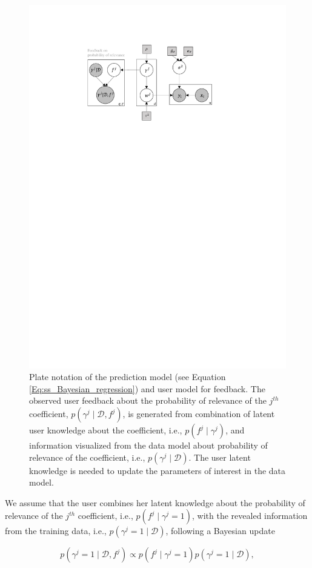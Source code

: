 \documentclass[dissertation,math,vertlayout,pdfa,colorlinks]{aaltoseries}
\newcommand{\bD}{\mathcal{D}}
\begin{document}
\begin{figure}
	\centering
	\includegraphics[width=0.80\linewidth]{Figures/Plate_diagram_OF.pdf}
	\caption{Plate notation of the prediction model (see Equation \ref{Eq:ss_Bayesian_regression}) and user model for feedback. The observed user feedback about the probability of relevance of the $j^{th}$ coefficient, $p(\gamma^j \mid \bD,f^j)$, is generated from combination of latent user knowledge about the coefficient, i.e., $p(f^j \mid \gamma^j)$, and information visualized from the data model about probability of relevance of the coefficient, i.e., $p(\gamma^j\mid \bD)$. The user latent knowledge is needed to update the parameters of interest in the data model.}
	\label{fig:Plate_OF}
\end{figure}
 
 
We assume that the user combines her latent knowledge about the probability of relevance of the $j^{th}$ coefficient, i.e., $p(f^{j} \mid \gamma^j=1)$, with the revealed information from the training data, i.e., $p(\gamma^j =1 \mid \bD)$, following a Bayesian update

\begin{equation}\label{Eq:Bayesian_update_biased_fb}
p(\gamma^j=1 \mid \bD, f^{j}) \propto p(f^{j}\mid \gamma^j=1)p(\gamma^j =1\mid \bD),
\end{equation}  
\end{document}
